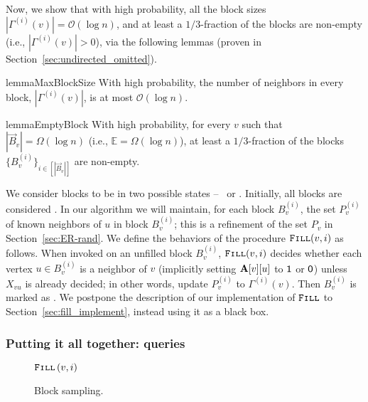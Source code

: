 Now, we show that with high probability, all the block sizes $|\Gamma^{(i)}(v)|=\mathcal{O}(\log n)$, and at least a $1/3$-fraction of the blocks are non-empty (i.e., $|\Gamma^{(i)}(v)|>0$), via the following lemmas (proven in Section~\ref{sec:undirected_omitted}).

\begin{restatable}{lemma}{MaxBlockSize}
\label{lem:MaxBlockSize}
With high probability, the number of neighbors in every block, $|\Gamma^{(i)}(v)|$, is at most $ \mathcal{O}(\log n)$.
\end{restatable}

\begin{restatable}{lemma}{EmptyBlock}
\label{lem:EmptyBlock}
With high probability, for every $v$ such that $|\vec B_v| = \Omega(\log n)$ (i.e., $\mathbb E = \Omega(\log n)$), at least a $1/3$-fraction of the blocks $\{B^{(i)}_v\}_{i\in[|\vec B_v|]}$ are non-empty.
\end{restatable}

We consider blocks to be in two possible states -- \filled~or \unfilled. Initially, all blocks are considered \unfilled.
In our algorithm we will maintain, for each block $B^{(i)}_v$, the set $P^{(i)}_v$ of known neighbors of $u$ in block $B^{(i)}_v$;
this is a refinement of the set $P_v$ in Section~\ref{sec:ER-rand}.
We define the behaviors of the procedure $\texttt{\textsc{Fill}}(v,i)$ as follows.
When invoked on an unfilled block $B^{(i)}_v$, $\texttt{\textsc{Fill}}(v,i)$ decides whether each vertex $u \in B^{(i)}_v$ is a neighbor of $v$
(implicitly setting $\mathbf{A}[v][u]$ to $\mathsf{1}$ or $\mathsf{0}$) unless $X_{vu}$ is already decided; in other words, update $P_v^{(i)}$ to $\Gamma^{(i)}(v)$.
Then $B^{(i)}_v$ is marked as \filled.
We postpone the description of our implementation of $\texttt{\textsc{Fill}}$ to Section~\ref{sec:fill_implement}, instead using it as a black box.





\subsubsection{Putting it all together:  queries}
\label{sec:random_neighbor}
\begin{wrapfigure}[10]{R}{0.47\textwidth}
\vspace{-0.75em}
\begin{framed}
    \renewcommand\figurename{Algorithm}
    \caption{Block sampling.}
    \label{alg:random}
    \begin{algorithmic}
                    \State$\texttt{\textsc{Fill}}\left( v,i\right)$
                \EndIf
            \EndWhile
        \EndProcedure
    \end{algorithmic}
\end{framed}
\end{wrapfigure}

